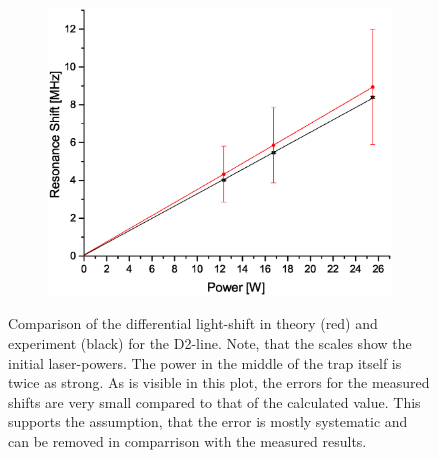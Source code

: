 \begin{figure}[H]
\centering
\begin{subfigure}[b]{0.8\textwidth}
                \includegraphics[width=\textwidth]{Shift2}
\end{subfigure}
\caption{Comparison of the differential light-shift in theory (red) and experiment (black) for the D2-line. Note, that the scales show the initial laser-powers. The power in the middle of the trap itself is twice as strong. As is visible in this plot, the errors for the measured shifts are very small compared to that of the calculated value. This supports the assumption, that the error is mostly systematic and can be removed in comparrison with the measured results.}
\label{shifts}
\end{figure}


